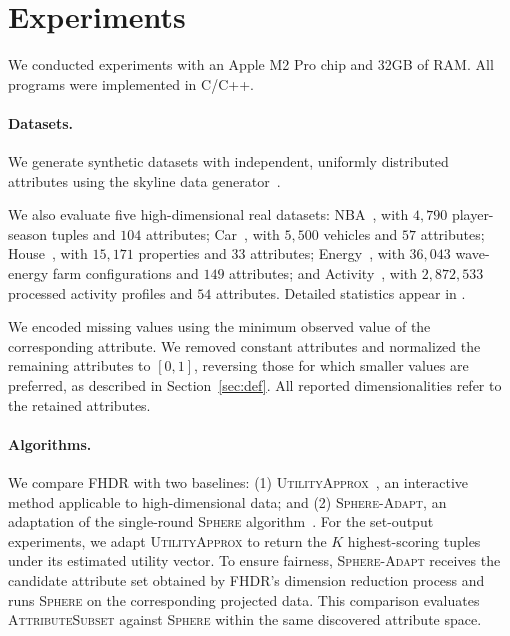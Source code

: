 \section{Experiments}
\label{sec:eval}

We conducted experiments with an Apple M2 Pro chip and 32GB of RAM. All programs were implemented in C/C++.

\paragraph{\textbf{Datasets. }}
We generate synthetic datasets with independent, uniformly distributed attributes using the skyline data generator~\cite{borzsony2001skyline}.

We also evaluate five high-dimensional real datasets: NBA~\cite{basketballReference}, with $4{,}790$ player-season tuples and $104$ attributes; Car~\cite{epaAutomotiveTrends}, with $5{,}500$ vehicles and $57$ attributes; House~\cite{house_austin}, with $15{,}171$ properties and $33$ attributes; Energy~\cite{large-scale_wave_energy_farm_882}, with $36{,}043$ wave-energy farm configurations and $149$ attributes; and Activity~\cite{pamap2_physical_activity_monitoring_231}, with $2{,}872{,}533$ processed activity profiles and $54$ attributes. Detailed statistics appear in \iftoggle{TechnicalReport}{Section~\ref{appen:setting} of the \technicalreport}{Appendix~\ref{appen:setting}}.

We encoded missing values using the minimum observed value of the corresponding attribute. We removed constant attributes and normalized the remaining attributes to $[0,1]$, reversing those for which smaller values are preferred, as described in Section~\ref{sec:def}. All reported dimensionalities refer to the retained attributes.

\paragraph{\textbf{Algorithms. }}
We compare \textsc{FHDR} with two baselines: (1) \textsc{UtilityApprox}~\cite{NL12}, an interactive method applicable to high-dimensional data; and (2) \textsc{Sphere-Adapt}, an adaptation of the single-round \textsc{Sphere} algorithm~\cite{XW18}. For the set-output experiments, we adapt \textsc{UtilityApprox} to return the $K$ highest-scoring tuples under its estimated utility vector. To ensure fairness, \textsc{Sphere-Adapt} receives the candidate attribute set obtained by FHDR’s dimension reduction process and runs \textsc{Sphere} on the corresponding projected data. This comparison evaluates \textsc{AttributeSubset} against \textsc{Sphere} within the same discovered attribute space.

